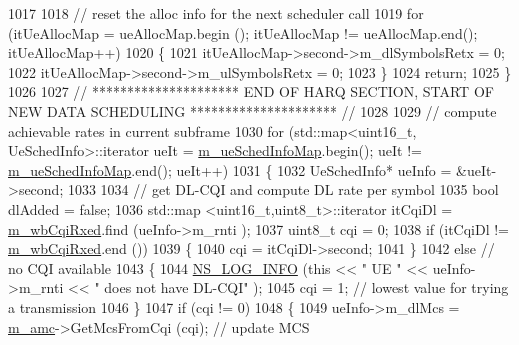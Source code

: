 \begin{DoxyCode}
1017 
1018                 \textcolor{comment}{// reset the alloc info for the next scheduler call}
1019                 \textcolor{keywordflow}{for} (itUeAllocMap = ueAllocMap.begin (); itUeAllocMap != ueAllocMap.end(); itUeAllocMap++)
1020                 \{
1021                         itUeAllocMap->second->m\_dlSymbolsRetx = 0;
1022                         itUeAllocMap->second->m\_ulSymbolsRetx = 0;
1023                 \}
1024                 \textcolor{keywordflow}{return};
1025         \}
1026 
1027         \textcolor{comment}{// ********************* END OF HARQ SECTION, START OF NEW DATA SCHEDULING ********************* //}
1028 
1029         \textcolor{comment}{// compute achievable rates in current subframe}
1030         \textcolor{keywordflow}{for} (std::map<uint16\_t, UeSchedInfo>::iterator ueIt = \hyperlink{classns3_1_1MmWaveFlexTtiPfMacScheduler_a3b6dd19d8156d24c8d30cc562843b740}{m\_ueSchedInfoMap}.begin(); 
      ueIt != \hyperlink{classns3_1_1MmWaveFlexTtiPfMacScheduler_a3b6dd19d8156d24c8d30cc562843b740}{m\_ueSchedInfoMap}.end(); ueIt++)
1031         \{
1032                 UeSchedInfo* ueInfo = &ueIt->second;
1033 
1034                 \textcolor{comment}{// get DL-CQI and compute DL rate per symbol}
1035                 \textcolor{keywordtype}{bool} dlAdded = \textcolor{keyword}{false};
1036                 std::map <uint16\_t,uint8\_t>::iterator itCqiDl = \hyperlink{classns3_1_1MmWaveFlexTtiPfMacScheduler_a2b746dc09bafd9ebdc2912b26c74beb9}{m\_wbCqiRxed}.find (ueInfo->m\_rnti
      );
1037                 uint8\_t cqi = 0;
1038                 \textcolor{keywordflow}{if} (itCqiDl != \hyperlink{classns3_1_1MmWaveFlexTtiPfMacScheduler_a2b746dc09bafd9ebdc2912b26c74beb9}{m\_wbCqiRxed}.end ())
1039                 \{
1040                         cqi = itCqiDl->second;
1041                 \}
1042                 \textcolor{keywordflow}{else} \textcolor{comment}{// no CQI available}
1043                 \{
1044                         \hyperlink{group__logging_gafbd73ee2cf9f26b319f49086d8e860fb}{NS\_LOG\_INFO} (\textcolor{keyword}{this} << \textcolor{stringliteral}{" UE "} << ueInfo->m\_rnti << \textcolor{stringliteral}{" does not have DL-CQI"}
      );
1045                         cqi = 1; \textcolor{comment}{// lowest value for trying a transmission}
1046                 \}
1047                 \textcolor{keywordflow}{if} (cqi != 0)
1048                 \{
1049                         ueInfo->m\_dlMcs = \hyperlink{classns3_1_1MmWaveFlexTtiPfMacScheduler_ab9cf29146f4e3094526de08ffe08b193}{m\_amc}->GetMcsFromCqi (cqi);  \textcolor{comment}{// update MCS}

\end{DoxyCode}
